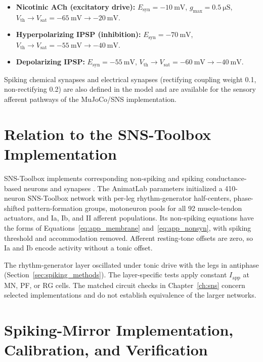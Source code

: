 \begin{itemize}
    \item \textbf{Nicotinic ACh (excitatory drive):}
          $E_{\text{syn}} = \qty{-10}{\mV}$,
          $g_{\text{max}} = \qty{0.5}{\micro\siemens}$,
          $V_{\text{th}} \to V_{\text{sat}} = \qty{-65}{\mV} \to \qty{-20}{\mV}$.
    \item \textbf{Hyperpolarizing IPSP (inhibition):}
          $E_{\text{syn}} = \qty{-70}{\mV}$,
          $V_{\text{th}} \to V_{\text{sat}} = \qty{-55}{\mV} \to \qty{-40}{\mV}$.
    \item \textbf{Depolarizing IPSP:}
          $E_{\text{syn}} = \qty{-55}{\mV}$,
          $V_{\text{th}} \to V_{\text{sat}} = \qty{-60}{\mV} \to \qty{-40}{\mV}$.
\end{itemize}

Spiking chemical synapses and electrical synapses (rectifying coupling weight 0.1, non-rectifying 0.2) are also defined in the model and are available for the sensory afferent pathways of the MuJoCo/SNS implementation.

\section{Relation to the SNS-Toolbox Implementation}

SNS-Toolbox implements corresponding non-spiking and spiking conductance-based neurons and synapses \citep{nourse_sns_2023}. The AnimatLab parameters initialized a 410-neuron SNS-Toolbox network with per-leg rhythm-generator half-centers, phase-shifted pattern-formation groups, motoneuron pools for all 92 muscle-tendon actuators, and Ia, Ib, and II afferent populations. Its non-spiking equations have the forms of Equations~\eqref{eq:app_membrane} and~\eqref{eq:app_nonsyn}, with spiking threshold and accommodation removed. Afferent resting-tone offsets are zero, so Ia and Ib encode activity without a tonic offset.

The rhythm-generator layer oscillated under tonic drive with the legs in antiphase (Section~\ref{sec:spiking_methods}). The layer-specific tests apply constant $I_{\text{app}}$ at MN, PF, or RG cells. The matched circuit checks in Chapter~\ref{ch:sns} concern selected implementations and do not establish equivalence of the larger networks.

\section{Spiking-Mirror Implementation, Calibration, and Verification}\label{app:spiking_details}

